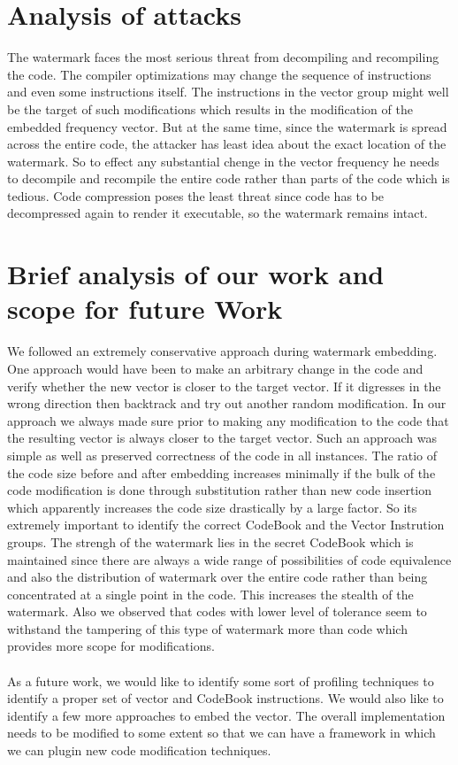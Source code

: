 \section{Analysis of attacks }
 The watermark faces the most serious threat from 
decompiling and recompiling the code. The compiler optimizations  may change the
 sequence of instructions and even some instructions itself. The instructions in
the vector group might well be the target of such modifications which results
 in the modification of the embedded frequency vector. But at the same time, since
 the watermark is spread across the entire code, the attacker has least idea about
the exact location of the watermark. So to effect any substantial chenge in the 
vector frequency he needs to decompile and recompile the entire code rather than
parts of the code which is tedious. Code compression poses the least threat since
code has to be decompressed again to render it executable, so the watermark 
remains intact.  

\section{Brief analysis of our work and scope for future Work } 
We followed an extremely conservative approach during watermark embedding. One
approach would have been to make an arbitrary change in the code and verify 
whether the new vector is closer to the target vector. If it digresses in the 
wrong direction then backtrack and try out another random modification. In our
approach we always made sure prior to making any modification to the code that the
resulting vector is always closer to the target vector. Such an approach was
simple as well as preserved correctness of the code in all instances. The 
ratio of the code size before and after embedding increases minimally if the 
bulk of the code modification is done through substitution rather than new
code insertion which apparently increases the code size drastically by a large
factor.  So its extremely important to identify the correct CodeBook and the 
Vector Instrution groups.  The strengh of the watermark lies in the secret 
CodeBook which is maintained since there are always a wide range of possibilities
of code equivalence and also the distribution of watermark over the entire
code rather than being concentrated at a single point in the code. This increases 
the stealth of the watermark. Also we observed that codes with lower level of
tolerance seem to withstand the tampering of this type of watermark more than code
 which provides more scope for modifications.\\\\
As a future work,  we would like to identify some sort of profiling techniques to 
identify a proper set of vector and CodeBook instructions. We would also like to
identify a few more approaches to embed the vector. The overall implementation 
needs to be modified to some extent so that we can have a  framework in which we
 can plugin new code modification techniques.

